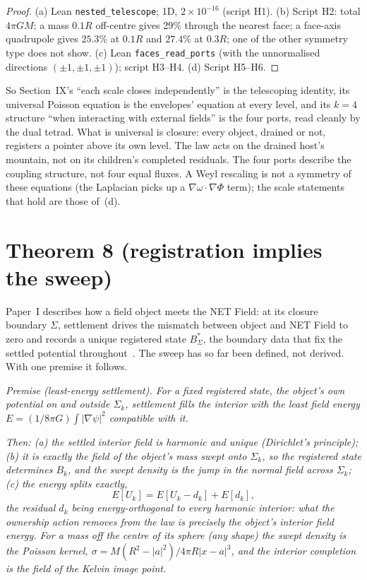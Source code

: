 \documentclass[twocolumn]{iopjournal}
\begin{document}
\begin{proof}
(a) Lean \texttt{nested\_telescope}; 1D, $2\times10^{-16}$ (script H1).
(b) Script H2: total $4\pi GM$; a mass $0.1R$ off-centre gives 29\% through
the nearest face; a face-axis quadrupole gives $25.3\%$ at $0.1R$ and
$27.4\%$ at $0.3R$; one of the other symmetry type does not show. (c)
Lean \texttt{faces\_read\_ports} (with the unnormalised directions
$(\pm1,\pm1,\pm1)$); script H3--H4. (d) Script H5--H6.
\end{proof}

So Section~IX's ``each scale closes independently'' is the telescoping
identity, its universal Poisson equation is the envelopes' equation at
every level, and its $k = 4$ structure ``when interacting with external
fields'' is the four ports, read cleanly by the dual tetrad. What is
universal is closure: every object, drained or not, registers a
pointer above its own level. The law acts on the drained host's
mountain, not on its children's completed residuals. The four ports
describe the coupling structure, not four
equal fluxes. A Weyl rescaling is not a symmetry of these equations
(the Laplacian picks up a $\nabla\omega\cdot\nabla\Phi$ term); the scale
statements that hold are those of~(d).


\section*{Theorem 8 (registration implies the sweep)}

Paper~I describes how a field object meets the NET Field: at its
closure boundary $\Sigma$, settlement drives the mismatch between object
and NET Field to zero and records a unique registered state
$B^*_\Sigma$, the boundary data that fix the settled potential
throughout~\cite{NelsonI}. The sweep has so far been defined, not
derived. With one premise it follows.

\emph{Premise (least-energy settlement). For a fixed registered state,
the object's own potential on and outside $\Sigma_k$, settlement fills
the interior with the least field energy
$E = (1/8\pi G)\int|\nabla\psi|^2$ compatible with it.}

\emph{Then: (a) the settled interior field is harmonic and unique
(Dirichlet's principle); (b) it is exactly the field of the object's
mass swept onto $\Sigma_k$, so the registered state determines $B_k$,
and the swept density is the jump in the normal field across $\Sigma_k$;
(c) the energy splits exactly,
\[
E[U_k] = E[U_k - d_k] + E[d_k],
\]
the residual $d_k$ being energy-orthogonal to every harmonic interior:
what the ownership action removes from the law is precisely the object's
interior field energy. For a mass off the centre of its sphere (any
shape) the swept density is the Poisson kernel,
$\sigma = M(R^2 - |a|^2)/4\pi R|x - a|^3$, and the interior completion is
the field of the Kelvin image point.}
\end{document}
